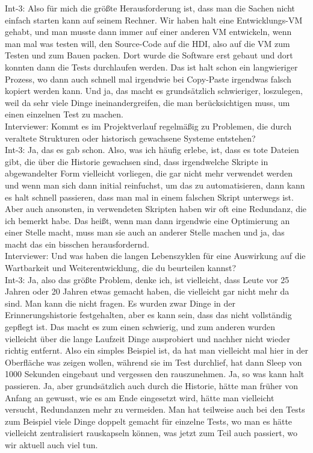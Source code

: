 Int-3: Also für mich die größte Herausforderung ist, dass man die Sachen nicht einfach starten kann auf seinem Rechner. Wir haben halt eine Entwicklungs-VM gehabt, und man musste dann immer auf einer anderen VM entwickeln, wenn man mal was testen will, den Source-Code auf die HDI, also auf die VM zum Testen und zum Bauen packen. Dort wurde die Software erst gebaut und dort konnten dann die Tests durchlaufen werden. Das ist halt schon ein langwieriger Prozess, wo dann auch schnell mal irgendwie bei Copy-Paste irgendwas falsch kopiert werden kann. Und ja, das macht es grundsätzlich schwieriger, loszulegen, weil da sehr viele Dinge ineinandergreifen, die man berücksichtigen muss, um einen einzelnen Test zu machen. \\
Interviewer: Kommt es im Projektverlauf regelmäßig zu Problemen, die durch veraltete Strukturen oder historisch gewachsene Systeme entstehen?\\
Int-3: Ja, das es gab schon. Also, was ich häufig erlebe, ist, dass es tote Dateien gibt, die über die Historie gewachsen sind, dass irgendwelche Skripte in abgewandelter Form vielleicht vorliegen, die gar nicht mehr verwendet werden und wenn man sich dann initial reinfuchst, um das zu automatisieren, dann kann es halt schnell passieren, dass man mal in einem falschen Skript unterwegs ist. Aber auch ansonsten, in verwendeten Skripten haben wir oft eine Redundanz, die ich bemerkt habe. Das heißt, wenn man dann irgendwie eine Optimierung an einer Stelle macht, muss man sie auch an anderer Stelle machen und ja, das macht das ein bisschen herausfordernd. \\
Interviewer: Und was haben die langen Lebenszyklen für eine Auswirkung auf die Wartbarkeit und Weiterentwicklung, die du beurteilen kannst?\\
Int-3: Ja, also das größte Problem, denke ich, ist vielleicht, dass Leute vor 25 Jahren oder 20 Jahren etwas gemacht haben, die vielleicht gar nicht mehr da sind. Man kann die nicht fragen. Es wurden zwar Dinge in der Erinnerungshistorie festgehalten, aber es kann sein, dass das nicht vollständig gepflegt ist. Das macht es zum einen schwierig, und zum anderen wurden vielleicht über die lange Laufzeit Dinge ausprobiert und nachher nicht wieder richtig entfernt. Also ein simples Beispiel ist, da hat man vielleicht mal hier in der Oberfläche was zeigen wollen, während sie im Test durchlief, hat dann Sleep von 1000 Sekunden eingebaut und vergessen den rauszunehmen. Ja, so was kann halt passieren. Ja, aber grundsätzlich auch durch die Historie, hätte man früher von Anfang an gewusst, wie es am Ende eingesetzt wird, hätte man vielleicht versucht, Redundanzen mehr zu vermeiden. Man hat teilweise auch bei den Tests zum Beispiel viele Dinge doppelt gemacht für einzelne Tests, wo man es hätte vielleicht zentralisiert rauskapseln können, was jetzt zum Teil auch passiert, wo wir aktuell auch viel tun. \\

